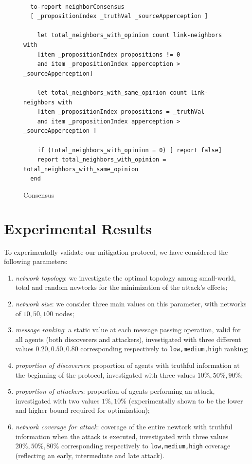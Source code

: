 \documentclass[compsoc, conference, letterpaper, 10pt, times]{IEEEtran}
\begin{document}
\begin{figure}[t]
 	\lstset{language=Java,
 		basicstyle=\scriptsize,
 		mathescape}
 	\begin{lstlisting}[frame=single]  % Start your code-block

  to-report neighborConsensus
  [ _propositionIndex _truthVal _sourceApperception ]

    let total_neighbors_with_opinion count link-neighbors with
    [item _propositionIndex propositions != 0
    and item _propositionIndex apperception > _sourceApperception]

    let total_neighbors_with_same_opinion count link-neighbors with
    [item _propositionIndex propositions = _truthVal
    and item _propositionIndex apperception > _sourceApperception ]

    if (total_neighbors_with_opinion = 0) [ report false]
    report total_neighbors_with_opinion = total_neighbors_with_same_opinion
  end
  \end{lstlisting}
  \caption{Consensus}\label{fig:consensus}
\end{figure}
%
%


\section{Experimental Results}\label{sec:experiments}

To experimentally validate our mitigation protocol, we have considered the following parameters:

\begin{enumerate}
\item \textit{network topology}: we investigate the optimal topology among small-world, total and random newtorks for the minimization of the attack's effects;
\item \textit{network size}: we consider three main values on this parameter, with networks of $10,50,100$ nodes;
\item \textit{message ranking}: a static value at each message passing operation, valid for all agents (both discoverers and attackers), investigated with three different values $0.20, 0.50, 0.80$ corresponding respectively to \texttt{low,medium,high} ranking;
\item \textit{proportion of discoverers}: proportion of agents with truthful information at the beginning of the protocol, investigated with three values $10\%, 50\%, 90\%$;
\item \textit{proportion of attackers}: proportion of agents performing an attack, investigated with two values $1\%, 10\%$ (experimentally shown to be the lower and higher bound required for optimization);
\item \textit{network coverage for attack}: coverage of the entire newtork with truthful information when the attack is executed, investigated with three values $20\%, 50\%, 80\%$ corresponding respectively to \texttt{low,medium,high} coverage (reflecting an early, intermediate and late attack).
\end{enumerate}
\end{document}
